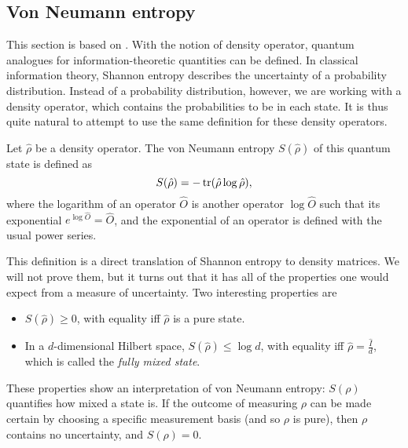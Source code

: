 \subsection{Von Neumann entropy}

This section is based on \cite[pp. 510-527]{nielsen_quantum_2010}. With the notion of density operator, quantum analogues for information-theoretic quantities can be defined. In classical information theory, Shannon entropy describes the uncertainty of a probability distribution. Instead of a probability distribution, however, we are working with a density operator, which contains the probabilities to be in each state. It is thus quite natural to attempt to use the same definition for these density operators.

\begin{definition}
    Let $\hat{\rho}$ be a density operator. The von Neumann entropy $S(\hat{\rho})$ of this quantum state is defined as
    \begin{equation}
        S(\hat{\rho}) = - \operatorname{tr}(\hat{\rho} \log \hat{\rho}),
    \end{equation}
    where the logarithm of an operator $\hat{O}$ is another operator $\log \hat{O}$ such that its exponential $e^{\log \hat{O}} = \hat{O}$, and the exponential of an operator is defined with the usual power series.
\end{definition}

This definition is a direct translation of Shannon entropy to density matrices. We will not prove them, but it turns out that it has all of the properties one would expect from a measure of uncertainty. Two interesting properties are

\begin{itemize}
    \item $S(\hat{\rho}) \geq 0$, with equality iff $\hat{\rho}$ is a pure state.
    \item In a $d$-dimensional Hilbert space, $S(\hat{\rho}) \leq \log d$, with equality iff $\hat{\rho} = \frac{\hat{I}}{d}$, which is called the \textit{fully mixed state}.
\end{itemize}

These properties show an interpretation of von Neumann entropy: $S(\rho)$ quantifies how mixed a state is. If the outcome of measuring $\rho$ can be made certain by choosing a specific measurement basis (and so $\rho$ is pure), then $\rho$ contains no uncertainty, and $S(\rho) = 0$.



